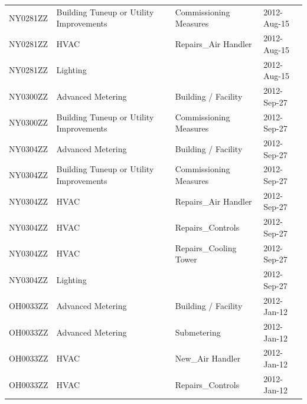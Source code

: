 \documentclass[12pt]{article}
\begin{document}
\begin{longtable}{lp{4cm}p{4cm}p{3cm}}
NY0281ZZ         & Building Tuneup or Utility Improvements & Commissioning Measures                    & 2012-Aug-15                   \\
NY0281ZZ         & HVAC                                    & Repairs\_Air Handler                      & 2012-Aug-15                   \\
NY0281ZZ         & Lighting                                &                                           & 2012-Aug-15                   \\
NY0300ZZ         & Advanced Metering                       & Building / Facility                       & 2012-Sep-27                   \\
NY0300ZZ         & Building Tuneup or Utility Improvements & Commissioning Measures                    & 2012-Sep-27                   \\
NY0304ZZ         & Advanced Metering                       & Building / Facility                       & 2012-Sep-27                   \\
NY0304ZZ         & Building Tuneup or Utility Improvements & Commissioning Measures                    & 2012-Sep-27                   \\
NY0304ZZ         & HVAC                                    & Repairs\_Air Handler                      & 2012-Sep-27                   \\
NY0304ZZ         & HVAC                                    & Repairs\_Controls                         & 2012-Sep-27                   \\
NY0304ZZ         & HVAC                                    & Repairs\_Cooling Tower                    & 2012-Sep-27                   \\
NY0304ZZ         & Lighting                                &                                           & 2012-Sep-27                   \\
OH0033ZZ         & Advanced Metering                       & Building / Facility                       & 2012-Jan-12                   \\
OH0033ZZ         & Advanced Metering                       & Submetering                               & 2012-Jan-12                   \\
OH0033ZZ         & HVAC                                    & New\_Air Handler                          & 2012-Jan-12                   \\
OH0033ZZ         & HVAC                                    & Repairs\_Controls                         & 2012-Jan-12                   \\

\end{longtable}
\end{document}
